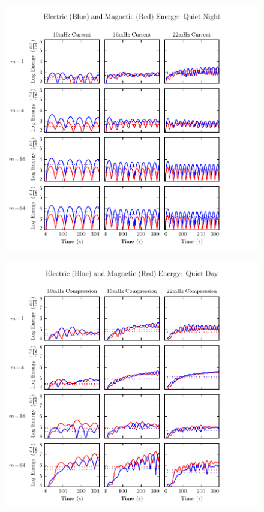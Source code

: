 \begin{figure}[H]
    \centering
    \includegraphics[width=\textwidth]{figures/UB_UE_J_4.pdf}
    \caption[Current-Driven Electric and Magnetic Energy: Quiet Night]{}
    \label{fig_UB_UE_J_4}
\end{figure}








\begin{figure}[H]
    \centering
    \includegraphics[width=\textwidth]{figures/UB_UE_B_2.pdf}
    \caption[Compression-Driven Electric and Magnetic Energy: Quiet Day]{}
    \label{fig_UB_UE_B_2}
\end{figure}


